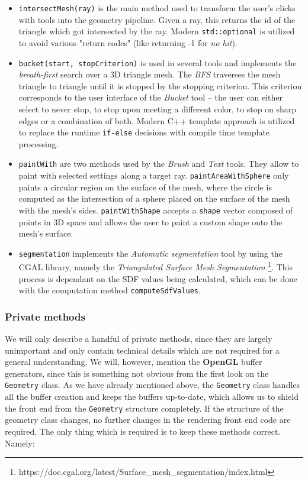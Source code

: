 \begin{itemize}
\item \texttt{intersectMesh(ray)} is the main method used to transform the user's clicks with tools into the geometry pipeline. Given a ray, this returns the id of the triangle which got intersected by the ray. Modern \texttt{std::optional} is utilized to avoid various "return codes" (like returning -1 for \textit{no hit}).

\item \texttt{bucket(start, stopCriterion)} is used in se\-ve\-ral tools and implements the \textit{breath-first} search over a 3D triangle mesh. The \textit{BFS} traverses the mesh triangle to triangle until it is stopped by the stopping criterion. This criterion corresponds to the user interface of the \textit{Bucket} tool -- the user can either select to never stop, to stop upon meeting a different color, to stop on sharp edges or a combination of both. Modern C++ template approach is utilized to replace the runtime \texttt{if-else} decisions with compile time template processing.

\item \texttt{paintWith} are two methods used by the \textit{Brush} and \textit{Text} tools. They allow to paint with selected settings along a target ray. \texttt{paintAreaWithSphere} only paints a circular region on the surface of the mesh, where the circle is computed as the intersection of a sphere placed on the surface of the mesh with the mesh's sides. \texttt{paintWithShape} accepts a \texttt{shape} vector composed of points in 3D space and allows the user to paint a custom shape onto the mesh's surface.

\item \texttt{segmentation} implements the \textit{Automatic segmentation} tool by using the CGAL library, namely the \textit{Triangulated Surface Mesh Segmentation} \footnote{https://doc.cgal.org/latest/Surface\_mesh\_segmentation/index.html}. This process is dependant on the SDF values being calculated, which can be done with the computation method \texttt{computeSdfValues}.
\end{itemize}

\subsubsection{Private methods}

We will only describe a handful of private methods, since they are largely unimportant and only contain technical details which are not required for a general understanding. We will, however, mention the \textbf{OpenGL} buffer generators, since this is something not obvious from the first look on the \texttt{Geometry} class. As we have already mentioned above, the \texttt{Geometry} class handles all the buffer creation and keeps the buffers up-to-date, which allows us to shield the front end from the \texttt{Geometry} structure completely. If the structure of the geometry class changes, no further changes in the rendering front end code are required. The only thing which is required is to keep these methods correct. Namely:

